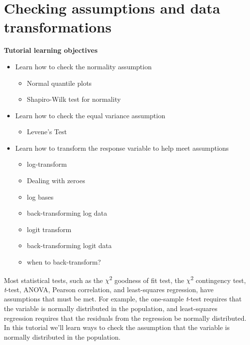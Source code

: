 \documentclass[
]{book}
\providecommand{\tightlist}{%
  \setlength{\itemsep}{0pt}\setlength{\parskip}{0pt}}
\begin{document}
\chapter{Checking assumptions and data transformations}\label{assumptions_trans}

\textbf{Tutorial learning objectives}

\begin{itemize}
\tightlist
\item
  Learn how to check the normality assumption

  \begin{itemize}
  \tightlist
  \item
    Normal quantile plots
  \item
    Shapiro-Wilk test for normality
  \end{itemize}
\item
  Learn how to check the equal variance assumption

  \begin{itemize}
  \tightlist
  \item
    Levene's Test
  \end{itemize}
\item
  Learn how to transform the response variable to help meet assumptions

  \begin{itemize}
  \tightlist
  \item
    log-transform
  \item
    Dealing with zeroes\\
  \item
    log bases
  \item
    back-transforming log data
  \item
    logit transform
  \item
    back-transforming logit data
  \item
    when to back-transform?
  \end{itemize}
\end{itemize}

Most statistical tests, such as the \(\chi\)\textsuperscript{2} goodness of fit test, the \(\chi\)\textsuperscript{2} contingency test, \emph{t}-test, ANOVA, Pearson correlation, and least-squares regression, have assumptions that must be met. For example, the one-sample \emph{t}-test requires that the variable is normally distributed in the population, and least-squares regression requires that the residuals from the regression be normally distributed. In this tutorial we'll learn ways to check the assumption that the variable is normally distributed in the population.
\end{document}
